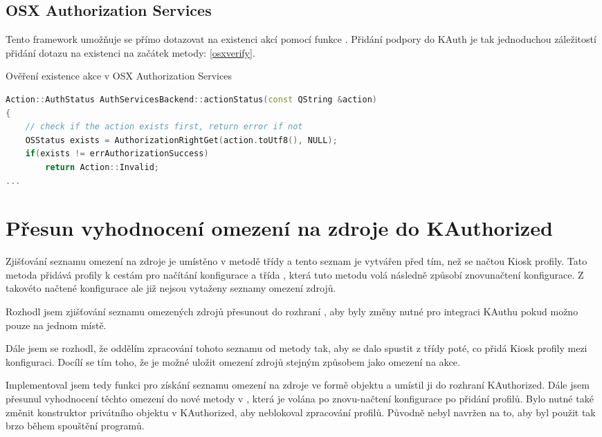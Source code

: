 \subsection*{OSX Authorization Services}
Tento framework umožňuje se přímo dotazovat na existenci akcí pomocí funkce . Přidání podpory do KAuth je tak jednoduchou záležitostí přidání dotazu na existenci na začátek metody: \ref{osxverify}.
\begin{mylisting}
\caption{Ověření existence akce v OSX Authorization Services}
\label{osxverify}
\begin{lstlisting}[language=C++]
Action::AuthStatus AuthServicesBackend::actionStatus(const QString &action)
{
    // check if the action exists first, return error if not
    OSStatus exists = AuthorizationRightGet(action.toUtf8(), NULL);
    if(exists != errAuthorizationSuccess)
        return Action::Invalid;
...
\end{lstlisting}
\end{mylisting}

\section{Přesun vyhodnocení omezení na zdroje do KAuthorized}
Zjišťování seznamu omezení na zdroje je umístěno v metodě  třídy  a tento seznam je vytvářen před tím, než se načtou Kiosk profily. Tato metoda přidává profily k cestám pro načítání konfigurace a třída , která tuto metodu volá následně způsobí znovunačtení konfigurace. Z takovéto načtené konfigurace ale již nejsou vytaženy seznamy omezení zdrojů.

Rozhodl jsem zjišťování seznamu omezených zdrojů přesunout do rozhraní , aby byly změny nutné pro integraci KAuthu pokud možno pouze na jednom místě.

Dále jsem se rozhodl, že oddělím zpracování tohoto seznamu od metody  tak, aby se dalo spustit z třídy  poté, co  přidá Kiosk profily mezi konfiguraci. Docílí se tím toho, že je možné uložit omezení zdrojů stejným způsobem jako omezení na akce.

Implementoval jsem tedy funkci  pro získání seznamu omezení na zdroje ve formě objektu  a umístil ji do rozhraní KAuthorized. Dále jsem přesunul vyhodnocení těchto omezení do nové metody \linebreak{} v , která je volána po znovu-načtení konfigurace po přidání profilů. Bylo nutné také změnit konstruktor privátního objektu v KAuthorized, aby neblokoval zpracování profilů. Původně nebyl navržen na to, aby byl použit tak brzo během spouštění programů.

